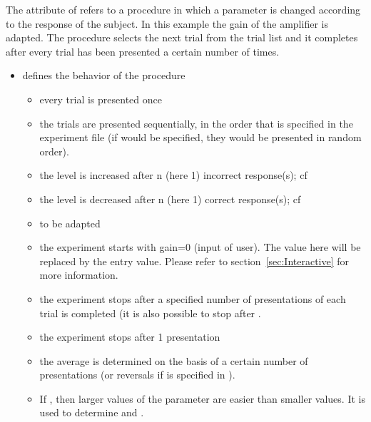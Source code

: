 The attribute  of
 refers to a procedure in which a parameter is
changed according to the response of the subject. In this example
the gain of the amplifier is adapted. The procedure selects the
next trial from the trial list and it completes after every trial
has been presented a certain number of times.

\begin{itemize}
\item {} defines the behavior of the procedure

\begin{itemize}

\item {} every trial is presented once

\item {} the trials are presented sequentially, in
the order that is specified in the experiment file (if
 would be specified, they would be presented in random
order).

\item {} the level is increased after n (here 1)
incorrect response(s); cf 

\item {} the level is decreased after n (here 1)
correct response(s); cf 

\item {} to be adapted

\item {} the experiment starts with gain=0
(input of user). The value here will be replaced by the entry
value. Please refer to section~\ref{sec:Interactive} for more
information.

\item {} the experiment stops after a
specified number of presentations of each trial is completed (it
is also possible to stop after .

\item {} the experiment stops after 1
presentation

\item {} the average is determined on the
basis of a certain number of presentations (or reversals if
 is specified in ).

\item {} If , then larger values
of the parameter are easier than smaller values. It is used to
determine  and .


\end{itemize}
\end{itemize}
